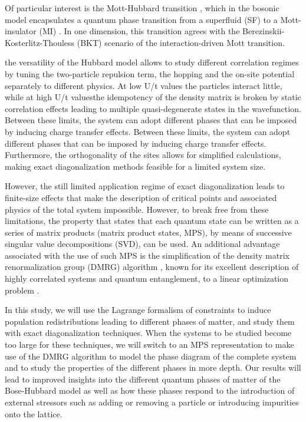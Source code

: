 \documentclass[twoside,twocolumn,9pt]{article}
\begin{document}
Of particular interest is the Mott-Hubbard transition \cite{mott1949}, which in the bosonic model encapsulates a quantum phase transition from a superfluid (SF) to a Mott-insulator (MI) \cite{elstner1999, capello2007, cucchietti2007}. In one dimension, this transition agrees with the Berezinskii-Kosterlitz-Thouless (BKT) \cite{kosterlitz1973} scenario of the interaction-driven Mott transition.

the versatility of the Hubbard model allows to study different correlation regimes by tuning the two-particle repulsion term, the hopping and the on-site potential separately to different physics. At low U/t values ​​the particles interact little, while at high U/t values ​​the idempotency of the density matrix is ​​broken by static correlation effects leading to multiple quasi-degenerate states in the wavefunction\cite{fabrizio1999, batista2004, scalettar2016, walsh2019a, walsh2019b}. Between these limits, the system can adopt different phases that can be imposed by inducing charge transfer effects. Between these limits, the system can adopt different phases that can be imposed by inducing charge transfer effects. Furthermore, the orthogonality of the sites allows for simplified calculations, making exact diagonalization \cite{zhang2010} methods feasible for a limited system size.

However, the still limited application regime of exact diagonalization leads to finite-size effects that make the description of critical points and associated physics of the total system impossible. However, to break free from these limitations, the property that states that each quantum state can be written as a series of matrix products (matrix product states, MPS)\cite{perez2006}, by means of successive singular value decompositions (SVD), can be used. An additional advantage associated with the use of such MPS is the simplification of the density matrix renormalization group (DMRG) algorithm \cite{white1993}, known for its excellent description of highly correlated systems and quantum entanglement, to a linear optimization problem \cite{schollwock2011a, schollwock2011b, verstraete2023}.

In this study, we will use the Lagrange formalism of constraints \cite{mukherji1963} to induce population redistributions leading to different phases of matter, and study them with exact diagonalization techniques. When the systems to be studied become too large for these techniques, we will switch to an MPS representation to make use of the DMRG algorithm to model the phase diagram of the complete system and to study the properties of the different phases in more depth. Our results will lead to improved insights into the different quantum phases of matter of the Bose-Hubbard model as well as how these phases respond to the introduction of external stressors such as adding or removing a particle or introducing impurities onto the lattice.
\end{document}
